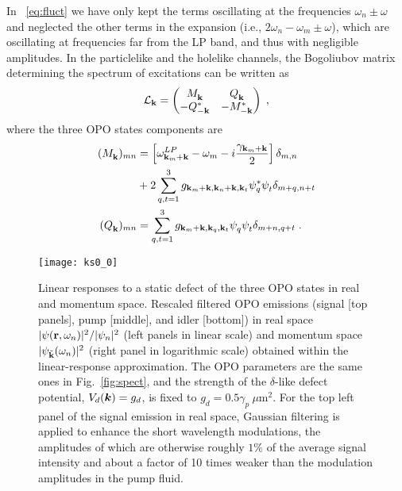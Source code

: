 In ~\eqref{eq:fluct} we have only kept the terms oscillating at the
frequencies $\omega_n \pm \omega$ and neglected the other terms in the
expansion (i.e., $2\omega_n - \omega_m \pm \omega$), which are
oscillating at frequencies far from the LP band, and thus with
negligible amplitudes.
%
In the particlelike and the holelike channels, the Bogoliubov matrix
determining the spectrum of excitations can be written
as~\cite{Wouters_2007}
%
\begin{equation}\label{eq:bogoliubov-opo}
  \mathcal{L}_{\mathbf{k}} = \begin{pmatrix} M_{\mathbf{k}}^{} & Q_{\mathbf{k}}^{}
    \\ -Q_{-\mathbf{k}}^* & -M_{-\mathbf{k}}^* \end{pmatrix} \; ,
\end{equation}
%
where the three OPO states components are
%
\begin{align}
  (M_{\vt{k}}^{})_{mn} &= \left[\omega^{LP}_{\vt{k}_m + \vt{k}}
    - \omega_m - i\frac{\gamma_{\vt{k}_m + \vt{k}}}{2}\right]
  \delta_{m,n} \\
%
  \nonumber & + 2\sum_{q,t=1}^3
  g_{\vt{k}_m+\vt{k},\vt{k}_n+\vt{k},\vt{k}_t} \psi_q^*
  \psi_t^{} \delta_{m+q,n+t}\\
%
  (Q_{\vt{k}}^{})_{mn} &= \sum_{q,t=1}^3
  g_{\vt{k}_m+\vt{k},\vt{k}_q,\vt{k}_t} \psi_q^{} \psi_t^{}
  \delta_{m+n,q+t}\; .
\end{align}
%
\begin{figure}[tb]
\centering
\texttt{[image: ks0\_0]}
\caption{Linear responses to a static defect of the three OPO states
  in real and momentum space. Rescaled filtered OPO emissions (signal
  [top panels], pump [middle], and idler [bottom]) in real space
  $|\psi (\mathbf{r},\omega_n)|^2/|\psi_n|^2$ (left panels in linear
  scale) and momentum space $|\psi_{\tilde{\mathbf{k}}} (\omega_n)|^2$
  (right panel in logarithmic scale) obtained within the
  linear-response approximation. The OPO parameters are the same ones
  in Fig.~\ref{fig:spect}, and the strength of the $\delta$-like
  defect potential, $V_d(\bm{k}) = g_d$, is fixed to
  $g_d = 0.5 \gamma_p~\mu$m$^2$. For the top left panel of the signal
  emission in real space, Gaussian filtering is applied to enhance the
  short wavelength modulations, the amplitudes of which are otherwise
  roughly $1\%$ of the average signal intensity and about a factor of
  10 times weaker than the modulation amplitudes in the pump fluid.}
\label{fig:ereal}
\end{figure}
%

